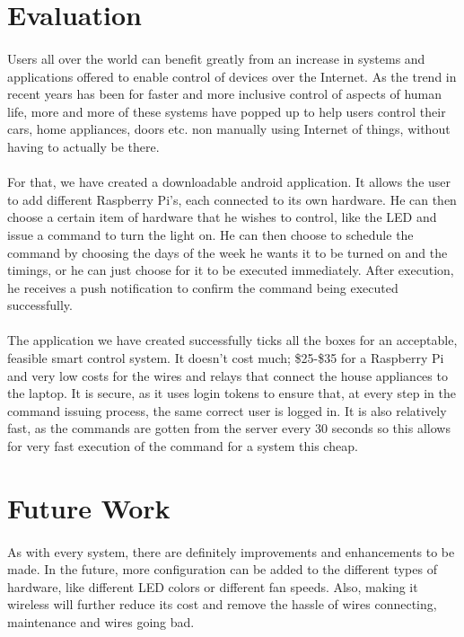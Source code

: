 \documentclass[12pt, oneside, a4paper]{book}
\begin{document}
		\section{Evaluation}
		\paragraph{} Users all over the world can benefit greatly from an increase in systems and applications offered to enable control of devices over the Internet. As the trend in recent years has been for faster and more inclusive control of aspects of human life, more and more of these systems have popped up to help users control their cars, home appliances, doors etc. non manually using Internet of things, without having to actually be there.
		\paragraph{} For that, we have created a downloadable android application. It allows the user to add different Raspberry Pi’s, each connected to its own hardware. He can then choose a certain item of hardware that he wishes to control, like the LED and issue a command to turn the light on. He can then choose to schedule the command by choosing the days of the week he wants it to be turned on and the timings, or he can just choose for it to be executed immediately. After execution, he receives a push notification to confirm the command being executed successfully.
		\paragraph{} The application we have created successfully ticks all the boxes for an acceptable, feasible smart control system. It doesn’t cost much; \$25-\$35 for a Raspberry Pi and very low costs for the wires and relays that connect the house appliances to the laptop. It is secure, as it uses login tokens to ensure that, at every step in the command issuing process, the same correct user is logged in. It is also relatively fast, as the commands are gotten from the server every 30 seconds so this allows for very fast execution of the command for a system this cheap.


		\section{Future Work}
		\paragraph{} As with every system, there are definitely improvements and enhancements to be made. In the future, more configuration can be added to the different types of hardware, like different LED colors or different fan speeds. Also, making it wireless will further reduce its cost and remove the hassle of wires connecting, maintenance and wires going bad. 
	\newpage
	
\end{document}
